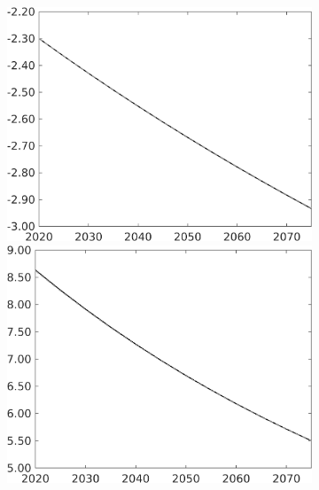 \begin{figure}[h!!]
\begin{subfigure}{0.75\textwidth}
\begin{minipage}[]{0.32\textwidth}
\end{minipage}
\begin{minipage}[]{0.32\textwidth}
	\includegraphics[width=1\textwidth]{../../codding_model/own_basedOnFried/optimalPol_010922_revision/figures/all_13Sept22/PerdifNoTauf_regime0_CompTaul_EY_spillover0_nsk0_xgr0_knspil1_sep0_LFlimit0_emsbase0_countec0_GovRev0_etaa0.79_lgd0.png}
\end{minipage}
\begin{minipage}[]{0.32\textwidth}
\includegraphics[width=1\textwidth]{../../codding_model/own_basedOnFried/optimalPol_010922_revision/figures/all_13Sept22/PerdifNoTauf_regime0_CompTaul_snS_spillover0_nsk0_xgr0_knspil1_sep0_LFlimit0_emsbase0_countec0_GovRev0_etaa0.79_lgd0.png}

\end{minipage}
\end{subfigure}
\end{figure}
